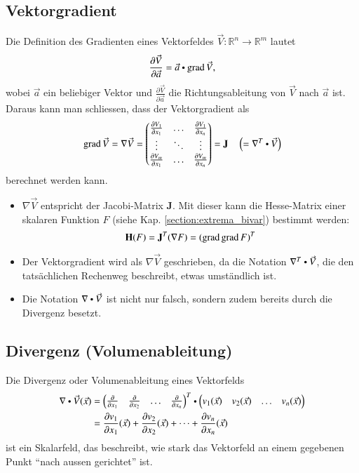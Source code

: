 \subsection{Vektorgradient}
Die Definition des Gradienten eines Vektorfeldes $\vec{V}: \mathbb{R}^n \to \mathbb{R}^m$ lautet
\[ \frac{\partial \vec{V}}{\partial \vec{a}} = \vec{a} \dotp \grad \vec{V}, \]
wobei $\vec{a}$ ein beliebiger Vektor und $\frac{\partial \vec{V}}{\partial \vec{a}}$ die Richtungsableitung von $\vec{V}$ nach $\vec{a}$ ist.
Daraus kann man schliessen, dass der Vektorgradient als
\[ 
    \grad \vec{V} 
    = \nabla \vec{V}
    = \begin{pmatrix}
        \frac{\partial V_1}{\partial x_1} & \hdots & \frac{\partial V_1}{\partial x_n} \\
        \vdots & \ddots & \vdots \\
        \frac{\partial V_m}{\partial x_1} & \hdots & \frac{\partial V_m}{\partial x_n} \\
    \end{pmatrix} 
    = \mathbf{J}
    \hspace{1em} \left(= \nabla^T \dotp \vec{V}\right)
\]
berechnet werden kann.
\begin{itemize}
    \item $\nabla \vec{V}$ entspricht der Jacobi-Matrix $\mathbf{J}$. 
          Mit dieser kann die Hesse-Matrix einer skalaren Funktion $F$ (siehe Kap. \ref{section:extrema_bivar}) bestimmt werden: \[ \mathbf{H}(F) = \mathbf{J}^T(\nabla F) = (\operatorname{grad} \operatorname{grad} F)^T \]
    \item Der Vektorgradient wird als $\nabla \vec{V}$ geschrieben, da die Notation $\nabla^T \dotp \vec{V}$, die den tatsächlichen Rechenweg beschreibt, etwas umständlich ist.
    \item Die Notation $\nabla \dotp \vec{V}$ ist nicht nur falsch, sondern zudem bereits durch die Divergenz besetzt.
\end{itemize}

\subsection{Divergenz (Volumenableitung)}
Die Divergenz oder Volumenableitung eines Vektorfelds
\[
\begin{aligned}
    \nabla \dotp \vec{V}(\vec{x})
    &= \begin{pmatrix} \frac{\partial}{\partial x_1} & \frac{\partial}{\partial x_2} & \dots & \frac{\partial}{\partial x_n} \end{pmatrix}^T \dotp \begin{pmatrix} v_1(\vec{x}) & v_2(\vec{x}) & \dots & v_n(\vec{x}) \end{pmatrix} \\
    &= \frac{\partial v_1}{\partial x_1}(\vec{x}) + \frac{\partial v_2}{\partial x_2}(\vec{x}) + \dots + \frac{\partial v_n}{\partial x_n}(\vec{x})
\end{aligned}
\]
ist ein Skalarfeld, das beschreibt, wie stark das Vektorfeld an einem gegebenen Punkt ``nach aussen gerichtet'' ist. 

